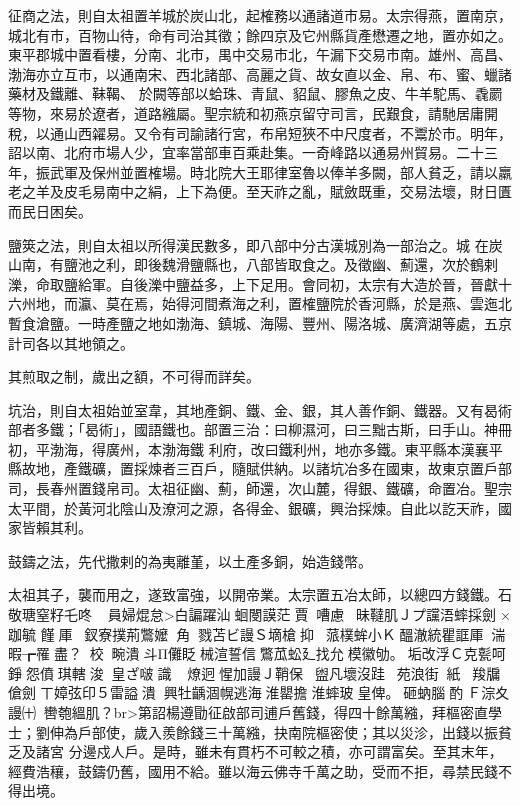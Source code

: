 
\begin{pinyinscope}

 征商之法，則自太祖置羊城於炭山北，起榷務以通諸道市易。太宗得燕，置南京，城北有市，百物山待，命有司治其徵；餘四京及它州縣貨產懋遷之地，置亦如之。東平郡城中置看樓，分南、北市，禺中交易市北，午漏下交易市南。雄州、高昌、渤海亦立互市，以通南宋、西北諸部、高麗之貨、故女直以金、帛、布、蜜、蠟諸藥材及鐵離、靺鞨、
 於闕等部以蛤珠、青鼠、貂鼠、膠魚之皮、牛羊駝馬、毳罽等物，來易於遼者，道路繈屬。聖宗統和初燕京留守司言，民艱食，請馳居庸開稅，以通山西糴易。又令有司諭諸行宮，布帛短狹不中尺度者，不鬻於市。明年，詔以南、北府市場人少，宜率當部車百乘赴集。一奇峰路以通易州貿易。二十三年，振武軍及保州並置榷場。時北院大王耶律室魯以俸羊多闕，部人貧乏，請以羸老之羊及皮毛易南中之絹，上下為便。至天祚之亂，賦斂既重，交易法壞，財日匱而民日困矣。



 鹽筴之法，則自太祖以所得漢民數多，即八部中分古漢城別為一部治之。城
 在炭山南，有鹽池之利，即後魏滑鹽縣也，八部皆取食之。及徵幽、薊還，次於鶴剌濼，命取鹽給軍。自後濼中鹽益多，上下足用。會同初，太宗有大造於晉，晉獻十六州地，而瀛、莫在焉，始得河間煮海之利，置榷鹽院於香河縣，於是燕、雲迤北暫食滄鹽。一時產鹽之地如渤海、鎮城、海陽、豐州、陽洛城、廣濟湖等處，五京計司各以其地領之。



 其煎取之制，歲出之額，不可得而詳矣。



 坑治，則自太祖始並室韋，其地產銅、鐵、金、銀，其人善作銅、鐵器。又有曷術部者多鐵；「曷術」，國語鐵也。部置三治：曰柳濕河，曰三黜古斯，曰手山。神冊初，平渤海，得廣州，本渤海鐵
 利府，改曰鐵利州，地亦多鐵。東平縣本漢襄平縣故地，產鐵礦，置採煉者三百戶，隨賦供納。以諸坑冶多在國東，故東京置戶部司，長春州置錢帛司。太祖征幽、薊，師還，次山麓，得銀、鐵礦，命置冶。聖宗太平間，於黃河北陰山及潦河之源，各得金、銀礦，興治採煉。自此以訖天祚，國家皆賴其利。



 鼓鑄之法，先代撒剌的為夷離堇，以土產多銅，始造錢幣。



 太祖其子，襲而用之，遂致富強，以開帝業。太宗置五冶太師，以總四方錢鐵。石敬瑭窒籽乇咚員婦焜怠>白諞躍汕蛔閿謨茫賈嘈慮昧韃肌Ｊプ讜浯蟀採劍×跏毓
 饉厙⒅釵寮撲荊鷩嬤角戮苫ビ謾Ｓ墑槍抑蒎樸蛑小Ｋ醞澈統瞿誆厙湍暇┲罹盡？┲校畹潰斗Π儺眨械渲誓信鷩苽蚣⼵找允模徽劬。垢改浮Ｃ克甏呵錚怨僨琪轄浚皇ざ啵識┧燎迥惺加謾Ｊ鞘保盥凡壞沒跬苑浪街紙羧牖傖劍ㄒ嫜弦印５雷謚潰興牡齲涸幌逃海淮罌擔淮蟀玻皇俾。砸蚋腦酌Ｆ淙⼢謾㈩轡匏縕肌？br>第詔楊遵勖征啟部司逋戶舊錢，得四十餘萬繈，拜樞密直學士；劉伸為戶部使，歲入羨餘錢三十萬繈，抉南院樞密使；其以災沴，出錢以振貧乏及諸宮
 分邊戍人戶。是時，雖未有貫朽不可較之積，亦可謂富矣。至其末年，經費浩穰，鼓鑄仍舊，國用不給。雖以海云佛寺千萬之助，受而不拒，尋禁民錢不得出境。




\end{pinyinscope}

